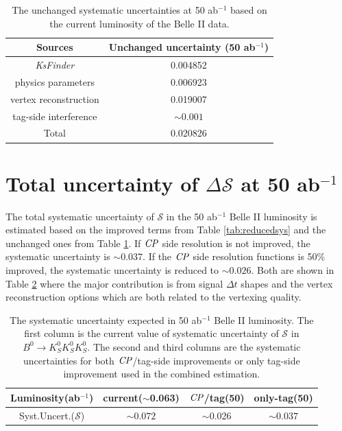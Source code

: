 \begin{table}[htpb]
	\centering
	\caption{The unchanged systematic uncertainties at 50 ab$^{-1}$ based on the current luminosity of the Belle II data.}
	\label{tab:unchangedsys}
	\begin{tabular}{c| c}
		\hline
		Sources & Unchanged uncertainty (50 ab$^{-1}$) \\
		\hline
		\textit{KsFinder} & 0.004852\\
		physics parameters &  0.006923 \\
		vertex reconstruction &  0.019007\\
		tag-side interference &  $\sim0.001$\\
		\hline
		Total & 0.020826\\
		\hline
	\end{tabular}
\end{table}

\section{Total uncertainty of $\Delta \mathcal{S}$ at 50 ab$^{-1}$}
The total systematic uncertainty of $\mathcal{S}$ in the 50 ab$^{-1}$ Belle II luminosity is estimated based on the improved terms from Table \ref{tab:reducedsys} and the unchanged ones from Table \ref{tab:unchangedsys}. If $\it{CP}$ side resolution is not improved, the systematic uncertainty is $\sim$0.037. If the $\it{CP}$ side resolution functions is 50\% improved, the systematic uncertainty is reduced to  $\sim0.026$. Both are shown in Table \ref{tab:sys_full} where the major contribution is from signal $\Delta t$ shapes and the vertex reconstruction options which are both related to the vertexing quality. 

\begin{table}[htpb]
	\centering
	\caption{The systematic uncertainty expected in 50 ab$^{-1}$ Belle II luminosity. The first column is the current value of systematic uncertainty of $\mathcal{S}$ in $B^0 \to K_S^0  K_S^0  K_S^0$. The second and third columns are the systematic uncertainties for both $\it{CP}$/tag-side improvements or only tag-side improvement used in the combined estimation.}
	\label{tab:sys_full}
	\begin{tabular}{c| c | c |c}
		\hline
		Luminosity(ab$^{-1}$) & current($\sim$0.063) & $\it{CP}$/tag(50)& only-tag(50)\\
		\hline
		Syst.Uncert.($\mathcal{S}$) & $\sim0.072$ & $\sim$0.026 & $\sim0.037$\\
		\hline
	\end{tabular}
\end{table}


